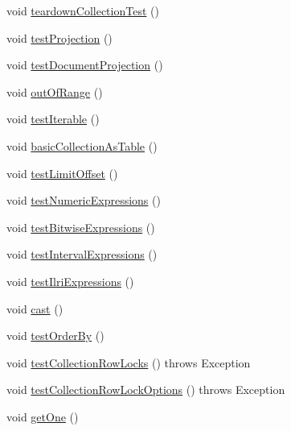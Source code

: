 \begin{DoxyCompactItemize}
\item 
void \mbox{\hyperlink{classtestsuite_1_1x_1_1devapi_1_1_collection_find_test_a85f37da3421e3458a0031285053577ab}{teardown\+Collection\+Test}} ()
\item 
void \mbox{\hyperlink{classtestsuite_1_1x_1_1devapi_1_1_collection_find_test_a1b50220cefcd3ed683dea19e4cf03d2f}{test\+Projection}} ()
\item 
void \mbox{\hyperlink{classtestsuite_1_1x_1_1devapi_1_1_collection_find_test_aabb25580db1d427289bd6959f9f43cbf}{test\+Document\+Projection}} ()
\item 
void \mbox{\hyperlink{classtestsuite_1_1x_1_1devapi_1_1_collection_find_test_a49cb1ae2846f450d2e1ad6dc08372fdb}{out\+Of\+Range}} ()
\item 
void \mbox{\hyperlink{classtestsuite_1_1x_1_1devapi_1_1_collection_find_test_a0e7eb5b849d5f54c8130792209ba6614}{test\+Iterable}} ()
\item 
void \mbox{\hyperlink{classtestsuite_1_1x_1_1devapi_1_1_collection_find_test_ace18579f524eda11d678d2e1e51020bd}{basic\+Collection\+As\+Table}} ()
\item 
void \mbox{\hyperlink{classtestsuite_1_1x_1_1devapi_1_1_collection_find_test_a9e10c825347be04d2cf7be6ed7d7ea04}{test\+Limit\+Offset}} ()
\item 
void \mbox{\hyperlink{classtestsuite_1_1x_1_1devapi_1_1_collection_find_test_a0db7b93b261dea1fbd88e07833eaadd8}{test\+Numeric\+Expressions}} ()
\item 
void \mbox{\hyperlink{classtestsuite_1_1x_1_1devapi_1_1_collection_find_test_ae784895d83bce7a727c1162c53608df3}{test\+Bitwise\+Expressions}} ()
\item 
void \mbox{\hyperlink{classtestsuite_1_1x_1_1devapi_1_1_collection_find_test_a99e33e53e04ef997e0fa6b8703a83ec9}{test\+Interval\+Expressions}} ()
\item 
void \mbox{\hyperlink{classtestsuite_1_1x_1_1devapi_1_1_collection_find_test_a628ce570b8d9e39fedef3676c395e7da}{test\+Ilri\+Expressions}} ()
\item 
void \mbox{\hyperlink{classtestsuite_1_1x_1_1devapi_1_1_collection_find_test_a522e87fd01482936a3f2fbf78a6c27e7}{cast}} ()
\item 
void \mbox{\hyperlink{classtestsuite_1_1x_1_1devapi_1_1_collection_find_test_ad6122cdd8010174aad944f962ccb2c8a}{test\+Order\+By}} ()
\item 
void \mbox{\hyperlink{classtestsuite_1_1x_1_1devapi_1_1_collection_find_test_aaff8756087bb2da824fde7cfbe7c1b6f}{test\+Collection\+Row\+Locks}} ()  throws Exception 
\item 
void \mbox{\hyperlink{classtestsuite_1_1x_1_1devapi_1_1_collection_find_test_a4095f02c90282daf5642db4e4cdf6955}{test\+Collection\+Row\+Lock\+Options}} ()  throws Exception 
\item 
void \mbox{\hyperlink{classtestsuite_1_1x_1_1devapi_1_1_collection_find_test_a09f863b160cf7b51e2fb76b712090cdc}{get\+One}} ()
\end{DoxyCompactItemize}
